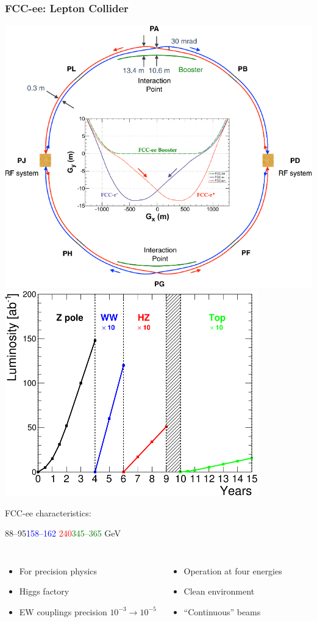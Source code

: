 \documentclass{beamer}
\newcommand{\bluetext}[1]{%
  \textcolor{myBlue}{#1}
}
\begin{document}
\begin{frame}
  \frametitle{FCC-ee: Lepton Collider}

  \includegraphics[width=.49\linewidth]{figures/FCC_ee_ring.png}
  \includegraphics[width=.49\linewidth]{figures/FCC_ee_operation_plan.png}

  \bluetext{FCC-ee characteristics:}
  {\footnotesize\hspace{5em}88--95\hspace{0.7em}\textcolor{blue}{158--162}
  \hspace{0.7em}\textcolor{red}{240}\hspace{0.7em}\textcolor{green}{345--365}
  GeV}
  \begin{columns}[c]
    \begin{itemize}
      \item For precision physics
      \item Higgs factory
      \item EW couplings precision $10^{-3} \rightarrow 10^{-5}$
    \end{itemize}

    \begin{itemize}
      \item Operation at four energies
      \item Clean environment
      \item ``Continuous'' beams
    \end{itemize}
  \end{columns}
\end{frame}
\end{document}
